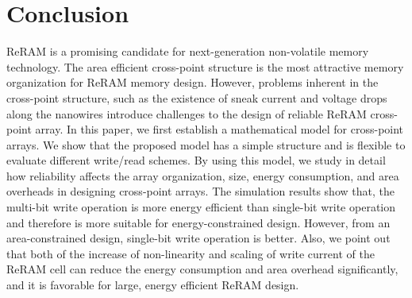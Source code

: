 
\section{Conclusion}\label{sec:conclusion}
\vspace{10pt} ReRAM is a promising candidate for next-generation
non-volatile memory technology. The area efficient cross-point structure
is the most attractive memory organization for ReRAM memory design.
However, problems inherent in the cross-point structure, such as the
existence of sneak current and voltage drops along the nanowires introduce
challenges to the design of reliable ReRAM cross-point array. In this
paper, we first establish a mathematical model for cross-point arrays. We
show that the proposed model has a simple structure and is flexible to
evaluate different write/read schemes. By using this model, we study in
detail how reliability affects the array organization, size, energy
consumption, and area overheads in designing cross-point arrays. The
simulation results show that, the multi-bit write operation is more energy
efficient than single-bit write operation and therefore is more suitable
for energy-constrained design. However, from an area-constrained design,
single-bit write operation is better. Also, we point out that both of the
increase of non-linearity and scaling of write current of the ReRAM cell
can reduce the energy consumption and area overhead significantly, and it
is favorable for large, energy efficient ReRAM design.
